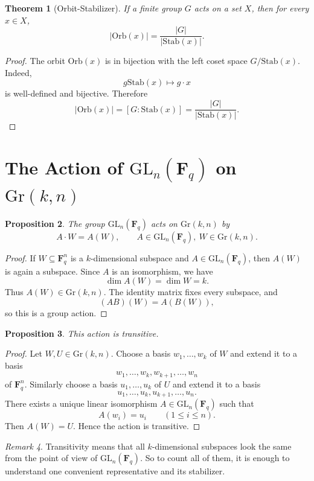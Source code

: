 \documentclass[11pt]{article}
\newtheorem{theorem}{Theorem}[section]
\newtheorem{proposition}[theorem]{Proposition}
\theoremstyle{definition}
\theoremstyle{remark}
\newtheorem{remark}[theorem]{Remark}
\newcommand{\F}{\mathbf{F}}
\newcommand{\GL}{\mathrm{GL}}
\newcommand{\Gr}{\mathrm{Gr}}
\newcommand{\Stab}{\mathrm{Stab}}
\newcommand{\Orb}{\mathrm{Orb}}
\begin{document}
	\begin{theorem}[Orbit-Stabilizer]
		If a finite group \(G\) acts on a set \(X\), then for every \(x\in X\),
		\[
		|\Orb(x)|=\frac{|G|}{|\Stab(x)|}.
		\]
	\end{theorem}
	
	\begin{proof}
		The orbit \(\Orb(x)\) is in bijection with the left coset space \(G/\Stab(x)\). Indeed,
		\[
		g\Stab(x)\longmapsto g\cdot x
		\]
		is well-defined and bijective. Therefore
		\[
		|\Orb(x)|=[G:\Stab(x)]=\frac{|G|}{|\Stab(x)|}.
		\]
	\end{proof}
	
	\section{The Action of \(\GL_n(\F_q)\) on \(\Gr(k,n)\)}
	
	\begin{proposition}
		The group \(\GL_n(\F_q)\) acts on \(\Gr(k,n)\) by
		\[
		A\cdot W = A(W),
		\qquad A\in \GL_n(\F_q),\ W\in \Gr(k,n).
		\]
	\end{proposition}
	
	\begin{proof}
		If \(W\subseteq \F_q^n\) is a \(k\)-dimensional subspace and \(A\in \GL_n(\F_q)\), then \(A(W)\) is again a subspace. Since \(A\) is an isomorphism, we have
		\[
		\dim A(W)=\dim W=k.
		\]
		Thus \(A(W)\in \Gr(k,n)\). The identity matrix fixes every subspace, and
		\[
		(AB)(W)=A(B(W)),
		\]
		so this is a group action.
	\end{proof}
	
	\begin{proposition}
		This action is transitive.
	\end{proposition}
	
	\begin{proof}
		Let \(W,U\in \Gr(k,n)\). Choose a basis \(w_1,\dots,w_k\) of \(W\) and extend it to a basis
		\[
		w_1,\dots,w_k,w_{k+1},\dots,w_n
		\]
		of \(\F_q^n\). Similarly choose a basis \(u_1,\dots,u_k\) of \(U\) and extend it to a basis
		\[
		u_1,\dots,u_k,u_{k+1},\dots,u_n.
		\]
		There exists a unique linear isomorphism \(A\in \GL_n(\F_q)\) such that
		\[
		A(w_i)=u_i \qquad (1\le i\le n).
		\]
		Then \(A(W)=U\). Hence the action is transitive.
	\end{proof}
	
	\begin{remark}
		Transitivity means that all \(k\)-dimensional subspaces look the same from the point of view of \(\GL_n(\F_q)\). So to count all of them, it is enough to understand one convenient representative and its stabilizer.
	\end{remark}
	
\end{document}
